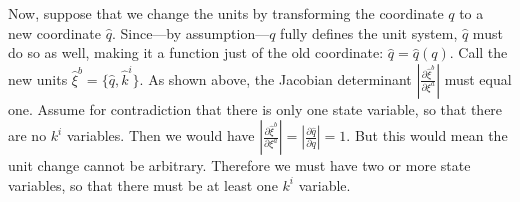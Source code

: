 \documentclass[letterpaper]{article}
\begin{document}
Now, suppose that we change the units by transforming the coordinate $q$ to a new coordinate $\hat{q}$. Since---by assumption---$q$ fully defines the unit system, $\hat{q}$ must do so as well, making it a function just of the old coordinate: $\hat{q}=\hat{q}(q)$. Call the new units $\hat{\xi}^b = \{ \hat{q}, \hat{k}^i\}$. As shown above, the Jacobian determinant $\left|\frac{\partial \hat{\xi}^b}{\partial \xi^a} \right|$ must equal one. Assume for contradiction that there is only one state variable, so that there are no $k^i$ variables. Then we would have $\left|\frac{\partial \hat{\xi}^b}{\partial \xi^a} \right| = \left|\frac{\partial \hat q}{\partial q} \right| = 1$. But this would mean the unit change cannot be arbitrary. Therefore we must have two or more state variables, so that there must be at least one $k^i$ variable. 

\end{document}
